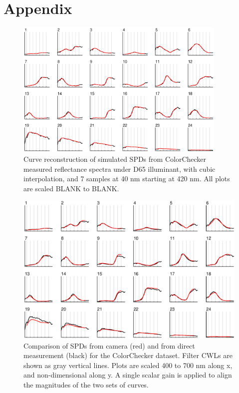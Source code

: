 \documentclass[twocolumn,10pt]{asme2ej}
\begin{document}
\clearpage

\section{Appendix}
\label{appendix}

\begin{figure}[H]
\begin{centering}
\includegraphics[width=0.90\textwidth]{colorchecker_reconstruction.eps}
\caption{Curve reconstruction of simulated SPDs from ColorChecker measured reflectance spectra under D65 illuminant, with cubic interpolation, and 7 samples at 40 nm starting at 420 nm. All plots are scaled BLANK to BLANK.}
\label{colorchecker_reconstruction}
\end{centering}
\end{figure}



\begin{figure}[H]
\centering
  \includegraphics[width=0.90\linewidth]{SPD_validation.eps}
  \caption{Comparison of SPDs from camera (red) and from direct measurement (black) for the ColorChecker dataset. Filter CWLs are shown as gray vertical lines. Plots are scaled 400 to 700 nm along x, and non-dimensional along y. A single scalar gain is applied to align the magnitudes of the two sets of curves.}
  \label{SPD_validation}
\end{figure}
\end{document}
